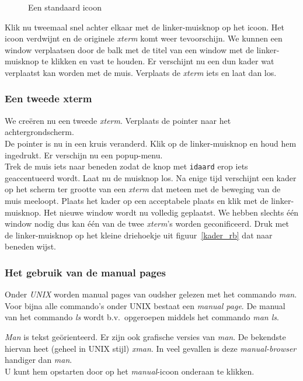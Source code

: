 \begin{figure}[bth]
\centerline{}
\caption{Een standaard icoon
\label{icon}}
\end{figure}
Klik nu tweemaal snel achter elkaar met de linker-muisknop
op het icoon.
Het icoon verdwijnt en de originele {\em xterm} komt weer tevoorschijn.
We kunnen een window verplaatsen door de balk met de titel van een
window met de linker-muisknop te klikken en vast te houden.
Er verschijnt nu een dun kader wat verplaatst kan worden met de muis.
Verplaats de {\em xterm} iets en laat dan los.

\subsubsection{Een tweede xterm}
\label{Een tweede xterm}
We cre\"eren nu een tweede {\em xterm}.
Verplaats de pointer naar het achtergrondscherm.\\
De pointer is nu in een kruis veranderd.
Klik op de linker-muisknop en houd hem ingedrukt.
Er verschijn nu een popup-menu.\\
Trek de muis iets naar beneden zodat de knop met {\tt idaard} erop
iets geaccentueerd wordt.
Laat nu de muisknop los.
Na enige tijd verschijnt een kader op het scherm
ter grootte van een {\em xterm}
dat meteen met de beweging van de muis meeloopt.
Plaats het kader op een acceptabele plaats en
klik met de linker-muisknop.
Het nieuwe window wordt nu volledig geplaatst.
We hebben slechts \'e\'en window nodig
dus kan \'e\'en van de twee {\em xterm}'s
worden ge{\ii}conificeerd.
Druk met de linker-muisknop op het kleine driehoekje uit
figuur~\ref{kader_rb} dat naar beneden wijst.

\subsubsection{Het gebruik van de manual pages}
\label{Het gebruik van de manual pages}

Onder {\em UNIX} worden manual pages van oudsher gelezen met het commando {\em man}.
Voor bijna alle commando's onder UNIX bestaat een {\em manual page}.
De manual van het commando {\em ls} wordt
b.v.\ opgeroepen middels het commando {\em man ls}.

{\em Man} is tekst ge\"orienteerd.
Er zijn ook grafische versies van {\em man}.
De bekendste hiervan heet (geheel in UNIX stijl) {\em xman}.
In veel gevallen is deze {\em manual-browser} handiger dan {\em man}.\\
U kunt hem opstarten door op het {\em manual}-icoon onderaan te klikken.

